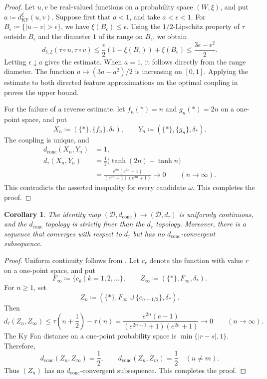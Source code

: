 \documentclass[10pt,a4paper]{amsart}
\newtheorem{corollary}[theorem]{Corollary}
\newcommand{\D}{\mathcal D}
\newcommand{\dconc}{d_{\mathrm{conc}}}
\newcommand{\dtau}{d_{\tau}}
\newcommand{\kf}{d_{\operatorname{KF}}}
\begin{document}
\begin{proof}
Let $u,v$ be real-valued functions on a probability space $(W,\xi)$, and put $a\coloneqq\kf^\xi(u,v)$. Suppose first that $a<1$, and take $a<\epsilon<1$. For $B_\epsilon\coloneqq\{|u-v|>\epsilon\}$, we have $\xi(B_\epsilon)\leq\epsilon$. Using the $1/2$-Lipschitz property of $\tau$ outside $B_\epsilon$ and the diameter $1$ of its range on $B_\epsilon$, we obtain
\[
d_{1,\xi}(\tau\circ u,\tau\circ v)
\leq\frac{\epsilon}{2}(1-\xi(B_\epsilon))+\xi(B_\epsilon)
\leq\frac{3\epsilon-\epsilon^2}{2}.
\]
Letting $\epsilon\downarrow a$ gives the estimate. When $a=1$, it follows directly from the range diameter. The function $a\mapsto(3a-a^2)/2$ is increasing on $[0,1]$. Applying the estimate to both directed feature approximations on the optimal coupling in  proves the upper bound.

For the failure of a reverse estimate, let $f_n(*)=n$ and $g_n(*)=2n$ on a one-point space, and put
\[
X_n\coloneqq(\{*\},\{f_n\},\delta_*),\qquad
Y_n\coloneqq(\{*\},\{g_n\},\delta_*).
\]
The coupling is unique, and
\[
\begin{aligned}
\dconc(X_n,Y_n)&=1,\\
\dtau(X_n,Y_n)
&=\frac12\bigl(\tanh(2n)-\tanh n\bigr)\\
&=\frac{e^{2n}(e^{2n}-1)}{(e^{4n}+1)(e^{2n}+1)}
\longrightarrow0
\qquad(n\to\infty).
\end{aligned}
\]
This contradicts the asserted inequality for every candidate $\omega$. This completes the proof.
\end{proof}


\begin{corollary}
\label{cor:full-topologies}
The identity map $(\D,\dconc)\to(\D,\dtau)$ is uniformly continuous, and the $\dconc$ topology is strictly finer than the $\dtau$ topology. Moreover, there is a sequence that converges with respect to $\dtau$ but has no $\dconc$-convergent subsequence.
\end{corollary}

\begin{proof}
Uniform continuity follows from . Let $c_r$ denote the function with value $r$ on a one-point space, and put
\[
F_\infty\coloneqq\{c_k\mid k=1,2,\ldots\},\qquad
Z_\infty\coloneqq(\{*\},F_\infty,\delta_*).
\]
For $n\geq1$, set
\[
Z_n\coloneqq(\{*\},F_\infty\cup\{c_{n+1/2}\},\delta_*).
\]
Then
\[
\dtau(Z_n,Z_\infty)
\leq\tau\left(n+\frac12\right)-\tau(n)
=\frac{e^{2n}(e-1)}{(e^{2n+1}+1)(e^{2n}+1)}
\longrightarrow0
\qquad(n\to\infty).
\]
The Ky Fan distance on a one-point probability space is $\min\{|r-s|,1\}$. Therefore,
\[
\dconc(Z_n,Z_\infty)=\frac12,
\qquad
\dconc(Z_n,Z_m)=\frac12\quad(n\neq m).
\]
Thus $(Z_n)$ has no $\dconc$-convergent subsequence. This completes the proof.
\end{proof}
\end{document}
